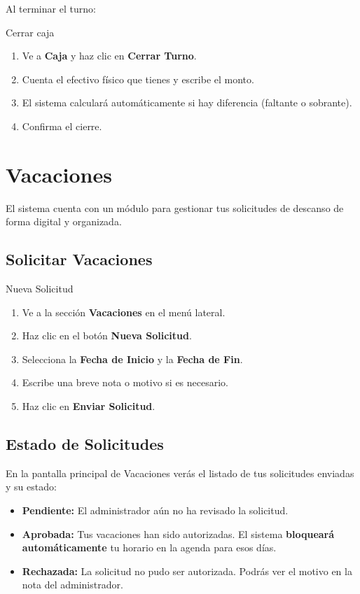\documentclass[12pt,a4paper]{article}
\begin{document}
Al terminar el turno:

\begin{pasobox}{Cerrar caja}
\begin{enumerate}[leftmargin=*]
  \item Ve a \textbf{Caja} y haz clic en \textbf{Cerrar Turno}.
  \item Cuenta el efectivo físico que tienes y escribe el monto.
  \item El sistema calculará automáticamente si hay diferencia (faltante o sobrante).
  \item Confirma el cierre.
\end{enumerate}
\end{pasobox}

\newpage
\section{Vacaciones}

El sistema cuenta con un módulo para gestionar tus solicitudes de descanso de forma digital y organizada.

\subsection{Solicitar Vacaciones}

\begin{pasobox}{Nueva Solicitud}
\begin{enumerate}[leftmargin=*]
  \item Ve a la sección \textbf{Vacaciones} en el menú lateral.
  \item Haz clic en el botón \textbf{Nueva Solicitud}.
  \item Selecciona la \textbf{Fecha de Inicio} y la \textbf{Fecha de Fin}.
  \item Escribe una breve nota o motivo si es necesario.
  \item Haz clic en \textbf{Enviar Solicitud}.
\end{enumerate}
\end{pasobox}

\subsection{Estado de Solicitudes}

En la pantalla principal de Vacaciones verás el listado de tus solicitudes enviadas y su estado:
\begin{itemize}[leftmargin=*]
  \item \textbf{Pendiente:} El administrador aún no ha revisado la solicitud.
  \item \textbf{Aprobada:} Tus vacaciones han sido autorizadas. El sistema \textbf{bloqueará automáticamente} tu horario en la agenda para esos días.
  \item \textbf{Rechazada:} La solicitud no pudo ser autorizada. Podrás ver el motivo en la nota del administrador.
\end{itemize}
\end{document}
